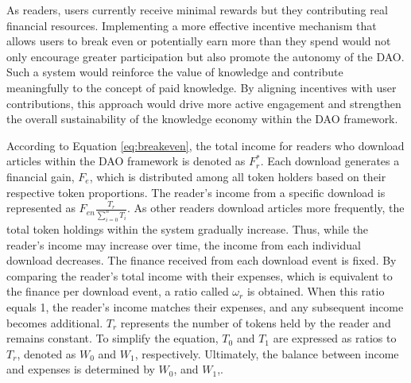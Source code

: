 \documentclass[lettersize,journal]{IEEEtran}
\begin{document}
As readers, users currently receive minimal rewards but they contributing real financial resources. Implementing a more effective incentive mechanism that allows users to break even or potentially earn more than they spend would not only encourage greater participation but also promote the autonomy of the DAO. Such a system would reinforce the value of knowledge and contribute meaningfully to the concept of paid knowledge. By aligning incentives with user contributions, this approach would drive more active engagement and strengthen the overall sustainability of the knowledge economy within the DAO framework.

According to Equation \ref{eq:breakeven}, the total income for readers who download articles within the DAO framework is denoted as $F_{r}^*$. Each download generates a financial gain, $F_{e}$, which is distributed among all token holders based on their respective token proportions. The reader's income from a specific download is represented as $F_{en} \frac{T_{r}}{\sum_{i=0}^{n}T_i}$. As other readers download articles more frequently, the total token holdings within the system gradually increase. Thus, while the reader's income may increase over time, the income from each individual download decreases.
The finance received from each download event is fixed. By comparing the reader's total income with their expenses, which is equivalent to the finance per download event, a ratio called $\omega_r$ is obtained. When this ratio equals 1, the reader's income matches their expenses, and any subsequent income becomes additional. $T_r$ represents the number of tokens held by the reader and remains constant. To simplify the equation, $T_0$ and $T_1$ are expressed as ratios to $T_r$, denoted as $W_0$ and $W_1$, respectively. Ultimately, the balance between income and expenses is determined by $W_0$, and $W_1$,.
\end{document}
